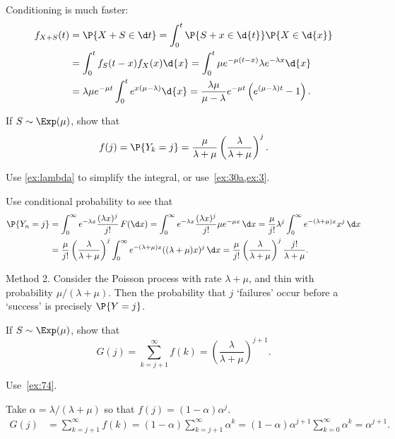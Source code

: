 \begin{exercise}
\begin{solution}
Conditioning is much faster:
 \begin{align*}
 f_{X+S}(t)
&= \P{X+S\in \d t}
= \int_0^t \P{S+x\in \d{t}}\P{X\in \d{x}} \\
&=\int_0^t f_S(t-x) f_X(x) \d{x}
 = \int_0^t \mu e^{-\mu(t-x)} \lambda e^{-\lambda x} \d{x} \\
 &= \lambda \mu e^{-\mu t} \int_0^t e^{x(\mu-\lambda)} \d{x} = \frac{\lambda \mu}{\mu - \lambda}e^{-\mu t}\left(e^{(\mu -\lambda)t} - 1\right).
 \end{align*}
\end{solution}
\end{exercise}


\begin{exercise}\label{ex:74}
 If $S\sim \Exp(\mu)$, show that
 \begin{equation*}
f(j) = \P{Y_k = j} = \frac{\mu}{\lambda+\mu}\left(\frac{\lambda}{\lambda+\mu}\right)^j.
 \end{equation*}
\begin{hint}
Use \cref{ex:lambda} to simplify the integral, or use~\cref{ex:30a,ex:3}.
\end{hint}
\begin{solution}
Use conditional probability to see that
\begin{align*}
 \P{Y_n = j}
&= \int_0^\infty e^{-\lambda x}\frac{(\lambda x)^j}{j!}\, F(\d x) = \int_0^\infty e^{-\lambda x}\frac{(\lambda x)^j}{j!} \mu e^{-\mu x}\, \d x
= \frac{\mu}{j!}\lambda^j \int_0^\infty e^{-(\lambda+\mu) x}x^j\,\d x \\
&= \frac{\mu}{j!}\left(\frac{\lambda}{\lambda+\mu}\right)^j \int_0^\infty e^{-(\lambda+\mu) x}((\lambda+\mu)x)^j\,\d x = \frac{\mu}{j!}\left(\frac{\lambda}{\lambda+\mu}\right)^j \frac{j!}{\lambda+\mu}.
\end{align*}

Method 2. Consider the Poisson process with rate $\lambda+\mu$, and thin with probability $\mu/(\lambda+\mu)$. Then the probability that $j$ `failures' occur before a `success' is precisely $\P{Y=j}$.
\end{solution}
\end{exercise}

\begin{exercise}\label{ex:l-225}
 If $S\sim \Exp(\mu)$, show that
 \begin{equation*}
G(j) = \sum_{k=j+1}^\infty f(k) = \left(\frac{\lambda}{\lambda+\mu}\right)^{j+1}.
 \end{equation*}
\begin{hint}
 Use~\cref{ex:74}.
\end{hint}
\begin{solution}
 Take $\alpha = \lambda/(\lambda+\mu)$ so that
 $f(j) = (1-\alpha) \alpha^j$.
\begin{align*}
 G(j)
&= \sum_{k=j+1}^\infty f(k) = (1-\alpha) \sum_{k=j+1}^\infty \alpha^k  = (1-\alpha) \alpha^{j+1}\sum_{k=0}^\infty \alpha^{k} = \alpha^{j+1}.
\end{align*}
\end{solution}
\end{exercise}


